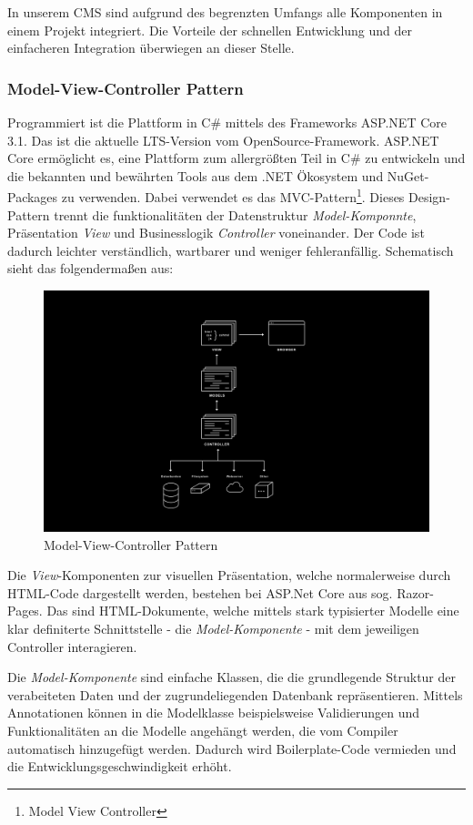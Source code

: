 \documentclass[titlepage, a4paper, 11pt]{scrartcl}
\begin{document}
      In unserem CMS sind aufgrund des begrenzten Umfangs alle Komponenten in einem Projekt integriert. 
      Die Vorteile der schnellen Entwicklung und der einfacheren Integration überwiegen an dieser Stelle.

      \subsubsection{Model-View-Controller Pattern}

        Programmiert ist die Plattform in C\# mittels des Frameworks ASP.NET Core 3.1. Das ist die aktuelle LTS-Version vom OpenSource-Framework.
        ASP.NET Core ermöglicht es, eine Plattform zum allergrößten Teil in C\# zu entwickeln und die bekannten und bewährten Tools aus dem .NET Ökosystem und NuGet-Packages zu verwenden.
        Dabei verwendet es das MVC-Pattern\footnote{Model View Controller}. Dieses Design-Pattern trennt die funktionalitäten der Datenstruktur \textit{Model-Komponnte}, Präsentation \textit{View}
        und Businesslogik \textit{Controller} voneinander. Der Code ist dadurch leichter verständlich, wartbarer und weniger fehleranfällig. Schematisch sieht das folgendermaßen aus:

        \begin{figure}[h]
          \centering
          \includegraphics[width=.6\textwidth]{MVC.png}
          \caption{Model-View-Controller Pattern}
          \label{MVC}
        \end{figure}
        
        Die \textit{View}-Komponenten zur visuellen Präsentation, welche normalerweise durch HTML-Code dargestellt werden, bestehen bei ASP.Net Core aus sog. Razor-Pages.
        Das sind HTML-Dokumente, welche mittels stark typisierter Modelle eine klar definiterte Schnittstelle - die \textit{Model-Komponente} - mit dem jeweiligen Controller interagieren.

        Die \textit{Model-Komponente} sind einfache Klassen, die die grundlegende Struktur der verabeiteten Daten und der zugrundeliegenden Datenbank repräsentieren.
        Mittels Annotationen können in die Modelklasse beispielsweise Validierungen und Funktionalitäten an die Modelle angehängt werden, die vom Compiler automatisch hinzugefügt werden.
        Dadurch wird Boilerplate-Code vermieden und die Entwicklungsgeschwindigkeit erhöht.
\end{document}
